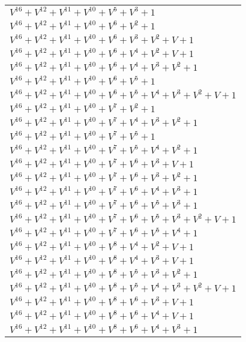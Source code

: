 \documentclass[12pt]{article}
\begin{document}
\begin{adjustwidth}{-4cm}{}
\begin{center}
\begin{longtable}{|l|}
$V^{16}  +V^{12}  +V^{11}  +V^{10}  +V^{5}  +V^{3}  + 1$ \\
$V^{16}  +V^{12}  +V^{11}  +V^{10}  +V^{6}  +V^{2}  + 1$ \\
$V^{16}  +V^{12}  +V^{11}  +V^{10}  +V^{6}  +V^{3}  +V^{2}  + V + 1$ \\
$V^{16}  +V^{12}  +V^{11}  +V^{10}  +V^{6}  +V^{4}  +V^{2}  + V + 1$ \\
$V^{16}  +V^{12}  +V^{11}  +V^{10}  +V^{6}  +V^{4}  +V^{3}  +V^{2}  + 1$ \\
$V^{16}  +V^{12}  +V^{11}  +V^{10}  +V^{6}  +V^{5}  + 1$ \\
$V^{16}  +V^{12}  +V^{11}  +V^{10}  +V^{6}  +V^{5}  +V^{4}  +V^{3}  +V^{2}  + V + 1$ \\
$V^{16}  +V^{12}  +V^{11}  +V^{10}  +V^{7}  +V^{2}  + 1$ \\
$V^{16}  +V^{12}  +V^{11}  +V^{10}  +V^{7}  +V^{4}  +V^{3}  +V^{2}  + 1$ \\
$V^{16}  +V^{12}  +V^{11}  +V^{10}  +V^{7}  +V^{5}  + 1$ \\
$V^{16}  +V^{12}  +V^{11}  +V^{10}  +V^{7}  +V^{5}  +V^{4}  +V^{2}  + 1$ \\
$V^{16}  +V^{12}  +V^{11}  +V^{10}  +V^{7}  +V^{6}  +V^{3}  + V + 1$ \\
$V^{16}  +V^{12}  +V^{11}  +V^{10}  +V^{7}  +V^{6}  +V^{3}  +V^{2}  + 1$ \\
$V^{16}  +V^{12}  +V^{11}  +V^{10}  +V^{7}  +V^{6}  +V^{4}  +V^{3}  + 1$ \\
$V^{16}  +V^{12}  +V^{11}  +V^{10}  +V^{7}  +V^{6}  +V^{5}  +V^{3}  + 1$ \\
$V^{16}  +V^{12}  +V^{11}  +V^{10}  +V^{7}  +V^{6}  +V^{5}  +V^{3}  +V^{2}  + V + 1$ \\
$V^{16}  +V^{12}  +V^{11}  +V^{10}  +V^{7}  +V^{6}  +V^{5}  +V^{4}  + 1$ \\
$V^{16}  +V^{12}  +V^{11}  +V^{10}  +V^{8}  +V^{4}  +V^{2}  + V + 1$ \\
$V^{16}  +V^{12}  +V^{11}  +V^{10}  +V^{8}  +V^{4}  +V^{3}  + V + 1$ \\
$V^{16}  +V^{12}  +V^{11}  +V^{10}  +V^{8}  +V^{5}  +V^{3}  +V^{2}  + 1$ \\
$V^{16}  +V^{12}  +V^{11}  +V^{10}  +V^{8}  +V^{5}  +V^{4}  +V^{3}  +V^{2}  + V + 1$ \\
$V^{16}  +V^{12}  +V^{11}  +V^{10}  +V^{8}  +V^{6}  +V^{3}  + V + 1$ \\
$V^{16}  +V^{12}  +V^{11}  +V^{10}  +V^{8}  +V^{6}  +V^{4}  + V + 1$ \\
$V^{16}  +V^{12}  +V^{11}  +V^{10}  +V^{8}  +V^{6}  +V^{4}  +V^{3}  + 1$ \\

\end{longtable}
\end{center}
\end{adjustwidth}
\end{document}
